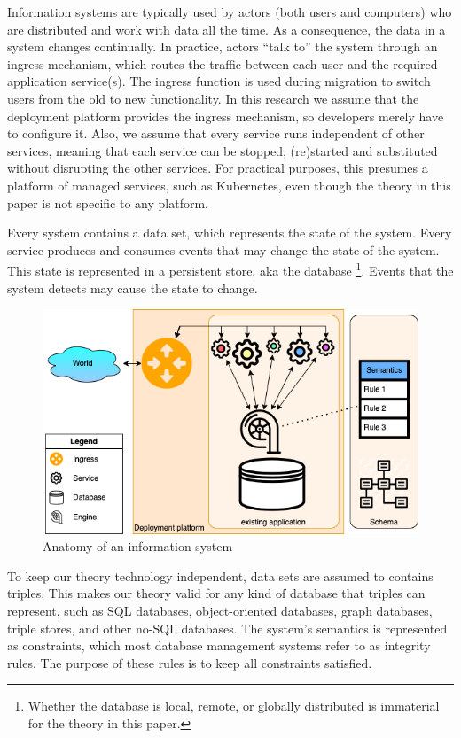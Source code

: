 \documentclass{elsarticle}
\begin{document}
   Information systems are typically used by actors (both users and computers) who are distributed and work with data all the time.
   As a consequence, the data in a system changes continually.
   In practice, actors ``talk to'' the system through an ingress mechanism,
   which routes the traffic between each user and the required application service(s).
   The ingress function is used during migration to switch users from the old to new functionality.
   In this research we assume that the deployment platform provides the ingress mechanism,
   so developers merely have to configure it.
   Also, we assume that every service runs independent of other services,
   meaning that each service can be stopped, (re)started and substituted without disrupting the other services.
   For practical purposes, this presumes a platform of managed services, such as Kubernetes,
   even though the theory in this paper is not specific to any platform.

   Every system contains a data set, which represents the state of the system.
   Every service produces and consumes events that may change the state of the system.
   This state is represented in a persistent store, aka the database%
\footnote{Whether the database is local, remote, or globally distributed is immaterial for the theory in this paper.}.
   Events that the system detects may cause the state to change.
\begin{figure}[bht]
   \begin{center}
     \includegraphics[scale=.45]{figures/datamigration-Pre-migration.png}
   \end{center}
\caption{Anatomy of an information system}
\label{fig:pre-migration}
\end{figure}
   To keep our theory technology independent, data sets are assumed to contains triples.
   This makes our theory valid for any kind of database that triples can represent,
   such as SQL databases, object-oriented databases, graph databases, triple stores, and other no-SQL databases.
   The system's semantics is represented as constraints,
   which most database management systems refer to as integrity rules.
   The purpose of these rules is to keep all constraints satisfied.
\end{document}
